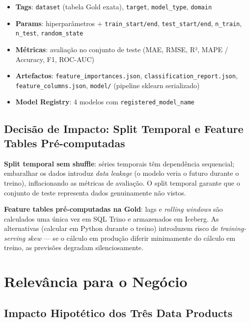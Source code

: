 \documentclass[11pt,a4paper]{article}
\begin{document}
\begin{itemize}[leftmargin=*,noitemsep]
  \item \textbf{Tags}: \texttt{dataset} (tabela Gold exata), \texttt{target}, \texttt{model\_type}, \texttt{domain}
  \item \textbf{Params}: hiperparâmetros + \texttt{train\_start/end}, \texttt{test\_start/end}, \texttt{n\_train}, \texttt{n\_test}, \texttt{random\_state}
  \item \textbf{Métricas}: avaliação no conjunto de teste (MAE, RMSE, R², MAPE / Accuracy, F1, ROC-AUC)
  \item \textbf{Artefactos}: \texttt{feature\_importances.json}, \texttt{classification\_report.json}, \texttt{feature\_columns.json}, \texttt{model/} (pipeline sklearn serializado)
  \item \textbf{Model Registry}: 4 modelos com \texttt{registered\_model\_name}
\end{itemize}

\subsection{Decisão de Impacto: Split Temporal e Feature Tables Pré-computadas}

\textbf{Split temporal sem shuffle}: séries temporais têm dependência sequencial; embaralhar os dados introduz \textit{data leakage} (o modelo veria o futuro durante o treino), inflacionando as métricas de avaliação. O split temporal garante que o conjunto de teste representa dados genuinamente não vistos.

\textbf{Feature tables pré-computadas na Gold}: lags e \textit{rolling windows} são calculados uma única vez em SQL Trino e armazenados em Iceberg. As alternativas (calcular em Python durante o treino) introduzem risco de \textit{training-serving skew} --- se o cálculo em produção diferir minimamente do cálculo em treino, as previsões degradam silenciosamente.

\section{Relevância para o Negócio}

\subsection{Impacto Hipotético dos Três Data Products}
\end{document}
